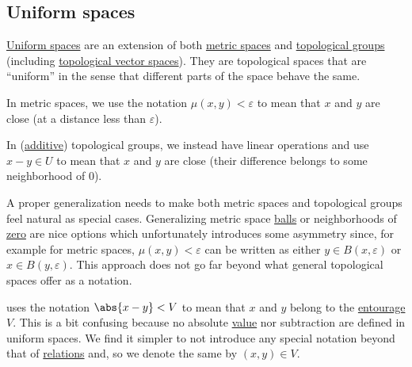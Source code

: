 \subsection{Uniform spaces}\label{subsec:uniform_spaces}

\begin{remark}\label{rem:entourage_notation}
  \hyperref[def:uniform_space]{Uniform spaces} are an extension of both \hyperref[def:metric_space]{metric spaces} and \hyperref[def:topological_group]{topological groups} (including \hyperref[def:topological_vector_space]{topological vector spaces}). They are topological spaces that are \enquote{uniform} in the sense that different parts of the space behave the same.

  In metric spaces, we use the notation \( \mu(x, y) < \varepsilon \) to mean that \( x \) and \( y \) are close (at a distance less than \( \varepsilon \)).

  In (\hyperref[rem:additive_magma]{additive}) topological groups, we instead have linear operations and use \( x - y \in U \) to mean that \( x \) and \( y \) are close (their difference belongs to some neighborhood of \( 0 \)).

  A proper generalization needs to make both metric spaces and topological groups feel natural as special cases. Generalizing metric space \hyperref[def:metric_space/ball]{balls} or neighborhoods of \hyperref[thm:origin_neighborhoods_in_topological_groups]{zero} are nice options which unfortunately introduces some asymmetry since, for example for metric spaces, \( \mu(x, y) < \varepsilon \) can be written as either \( y \in B(x, \varepsilon) \) or \( x \in B(y, \varepsilon) \). This approach does not go far beyond what general topological spaces offer as a notation.

  \cite[section 8]{Engelking1989} uses the notation \( \abs{x - y} < V \) to mean that \( x \) and \( y \) belong to the \hyperref[def:entourage]{entourage} \( V \). This is a bit confusing because no absolute \hyperref[def:absolute_value]{value} nor subtraction are defined in uniform spaces. We find it simpler to not introduce any special notation beyond that of \hyperref[def:relation]{relations} and, so we denote the same by \( (x, y) \in V \).
\end{remark}

